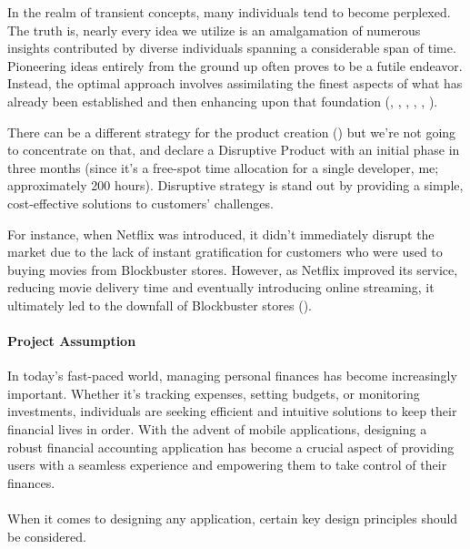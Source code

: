 
In the realm of transient concepts, many individuals tend to become perplexed. The truth is, nearly every idea we 
utilize is an amalgamation of numerous insights contributed by diverse individuals spanning a considerable span of 
time. Pioneering ideas entirely from the ground up often proves to be a futile endeavor. Instead, the optimal approach 
involves assimilating the finest aspects of what has already been established and then enhancing upon that foundation
(\cite{John11}, \cite{Azar22}, \cite{Page19}, \cite{Bara18}, \cite{Kleo12}, \cite{Thag12}).

There can be a different strategy for the product creation (\cite{Lomb17}) but we're not going to concentrate on that,
and declare a Disruptive Product with an initial phase in three months (since it's a free-spot time allocation
for a single developer, me; approximately 200 hours). Disruptive strategy is stand out by providing a simple, 
cost-effective solutions to customers' challenges. 

For instance, when Netflix was introduced, it didn't immediately disrupt the market due to the lack of instant 
gratification for customers who were used to buying movies from Blockbuster stores. However, as Netflix 
improved its service, reducing movie delivery time and eventually introducing online streaming, it ultimately led 
to the downfall of Blockbuster stores (\cite{Eby17}).

\paragraph{Project Assumption}
In today's fast-paced world, managing personal finances has become increasingly important. Whether it's tracking 
expenses, setting budgets, or monitoring investments, individuals are seeking efficient and intuitive solutions to 
keep their financial lives in order. With the advent of mobile applications, designing a robust financial accounting 
application has become a crucial aspect of providing users with a seamless experience and empowering them to take 
control of their finances.\\
\\

\noindent When it comes to designing any application, certain key design principles should be considered. 

